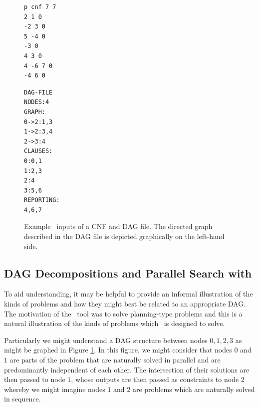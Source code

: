 \documentclass[
10pt, %
a4paper, %
oneside, %
headinclude,footinclude, %
BCOR5mm, %
]{scrartcl}
\begin{document}
\begin{figure}
\centering
\begin{minipage}{0.2\textwidth}
\end{minipage}
\begin{minipage}{0.3\textwidth}
\centering
\begin{Verbatim}[frame=single, label=CNF file]
p cnf 7 7
2 1 0
-2 3 0
5 -4 0
-3 0
4 3 0
4 -6 7 0
-4 6 0
\end{Verbatim}
\end{minipage}
\begin{minipage}{0.3\textwidth}
\centering
\begin{Verbatim}[frame=single, label=DAG file]
DAG-FILE
NODES:4
GRAPH:
0->2:1,3
1->2:3,4
2->3:4
CLAUSES:
0:0,1
1:2,3
2:4
3:5,6
REPORTING:
4,6,7
\end{Verbatim}
\end{minipage}

\caption[Hand-worked CNF and DAG file examples]{Example \dagster\  inputs of a CNF and DAG file. The directed graph described in the DAG file is depicted graphically on the left-hand side.}\label{fig:cnf_dag_example}
\end{figure}




\subsection{DAG Decompositions and Parallel Search with \dagster}

To aid understanding, it may be helpful to provide an informal illustration of the kinds of problems and how they might best be related to an appropriate DAG.
The motivation of the \dagster\  tool was to solve planning-type problems and this is a natural illustration of the kinds of problems which \dagster\  is designed to solve.

Particularly we might understand a DAG structure between nodes $0,1,2,3$ as might be graphed in Figure \ref{fig:cnf_dag_example}.
In this figure, we might consider that nodes $0$ and $1$ are parts of the problem that are naturally solved in parallel and are predominantly independent of each other.
The intersection of their solutions are then passed to node $1$, whose outputs are then passed as constraints to node $2$ whereby we might imagine nodes $1$ and $2$ are problems which are naturally
solved in sequence.
\end{document}
